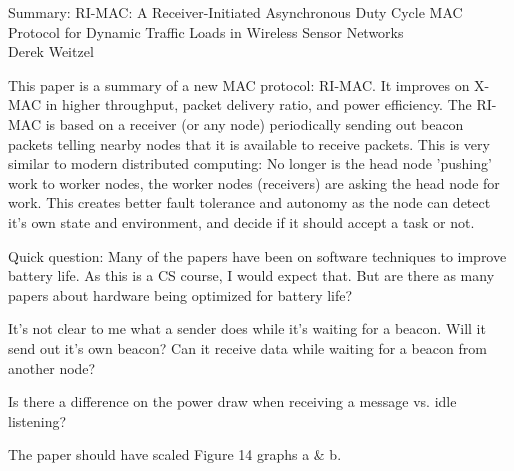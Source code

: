 \documentclass[12pt]{article}
\begin{document}
\begin{center}
{\huge Summary: RI-MAC: A Receiver-Initiated Asynchronous Duty Cycle MAC Protocol for Dynamic Traffic Loads in Wireless Sensor Networks } \\
Derek Weitzel
\end{center}

This paper is a summary of a new MAC protocol: RI-MAC.  It improves on X-MAC in higher throughput, packet delivery ratio, and power efficiency.  The RI-MAC is based on a receiver (or any node) periodically sending out beacon packets telling nearby nodes that it is available to receive packets.  This is very similar to modern distributed computing: No longer is the head node 'pushing' work to worker nodes, the worker nodes (receivers) are asking the head node for work.  This creates better fault tolerance and autonomy as the node can detect it's own state and environment, and decide if it should accept a task or not.

Quick question: Many of the papers have been on software techniques to improve battery life.  As this is a CS course, I would expect that.  But are there as many papers about hardware being optimized for battery life?  

It's not clear to me what a sender does while it's waiting for a beacon.  Will it send out it's own beacon?  Can it receive data while waiting for a beacon from another node?

Is there a difference on the power draw when receiving a message vs. idle listening?

The paper should have scaled Figure 14 graphs a \& b.
\end{document}
